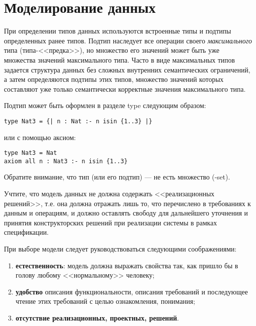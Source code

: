 \documentclass[14pt, twoside]{extreport}
\newcounter{problem_type}[chapter]
\newcounter{zadacha}[problem_type]
\newcommand{\z}{\vspace{0.5cm}\par\addtocounter{zadacha}{1}%
\textit{\arabic{chapter}.\arabic{problem_type}.\arabic{zadacha}}~~  }
\newcommand{\head}[1]{\vspace{1cm}\subsubsection*{#1}}
\newcommand{\zhead}[1]{\head{#1} \refstepcounter{problem_type}}
\begin{document}


\section{Моделирование данных}

При определении типов данных используются встроенные типы и подтипы определенных ранее типов. Подтип наследует все операции своего \emph{максимального} типа (типа-<<предка>>), но множество его значений может быть уже множества значений максимального типа. Часто в виде максимальных типов задается структура данных без сложных внутренних семантических ограничений, а затем определяются подтипы этих типов, множество значений которых составляют уже только семантически корректные значения максимального типа.

Подтип может быть оформлен в разделе type следующим образом:
\begin{lstlisting}
type Nat3 = {| n : Nat :- n isin {1..3} |}
\end{lstlisting}

или с помощью аксиом:
\begin{lstlisting}
type Nat3 = Nat
axiom all n : Nat3 :- n isin {1..3}
\end{lstlisting}

Обратите внимание, что тип (или его подтип) --- не есть множество (-set).

Учтите, что модель данных не должна содержать <<реализационных решений>>, т.е. она должна отражать лишь то, что перечислено в требованиях к данным и операциям, и должно оставлять свободу для дальнейшего уточнения и принятия конструкторских решений при реализации системы в рамках спецификации.

При выборе модели следует руководствоваться следующими соображениями:
\begin{enumerate}
  \item \textbf{естественность}: модель должна выражать свойства так, как пришло бы в голову любому <<нормальному>> человеку;
  \item \textbf{удобство} описания функциональности, описания требований и последующее чтение этих требований с целью ознакомления, понимания;
  \item \textbf{отсутствие реализационных, проектных, решений}.
\end{enumerate}
\end{document}
